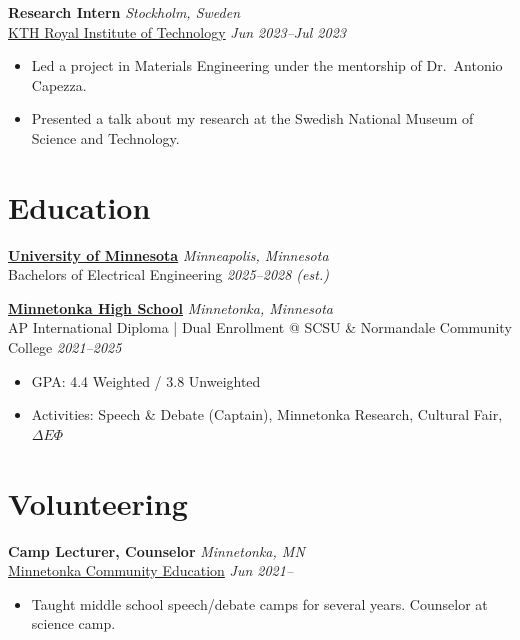 \documentclass[11pt, letterpaper]{article}
\begin{document}
\vspace{0.5em}

\noindent\textbf{{Research Intern}} \hfill \textit{Stockholm, Sweden}\\
\href{https://www.linkedin.com/school/kth/}{KTH Royal Institute of Technology} \hfill \textit{Jun 2023--Jul 2023}
\begin{itemize}
\item Led a project in Materials Engineering under the mentorship of Dr.\ Antonio Capezza.
\item Presented a talk about my research at the Swedish National Museum of Science and Technology.
\end{itemize}

\vspace{-1em}
\section{\Large{Education}}

\noindent\textbf{{\href{https://www.linkedin.com/school/university-of-minnesota/}{University of Minnesota}}} \hfill \textit{Minneapolis, Minnesota}\\
Bachelors of Electrical Engineering \hfill \textit{2025--2028 (est.)}

\vspace{0.5em}

\noindent\textbf{{\href{https://www.linkedin.com/school/minnetonka-senior-high-school/}{Minnetonka High School}}} \hfill \textit{Minnetonka, Minnesota}\\
AP International Diploma | Dual Enrollment @ SCSU \& Normandale Community College \hfill \textit{2021--2025}
\begin{itemize}
\item GPA\@: 4.4 Weighted / 3.8 Unweighted
\item Activities: Speech \& Debate (Captain), Minnetonka Research, Cultural Fair, $\Delta E\Phi$
\end{itemize}

\vspace{-1em}
\section{\Large{Volunteering}}

\noindent\textbf{{Camp Lecturer, Counselor}} \hfill \textit{Minnetonka, MN}\\
\href{https://www.linkedin.com/company/107129508/admin/dashboard/}{Minnetonka Community Education} \hfill \textit{Jun 2021--}
\begin{itemize}
\item Taught middle school speech/debate camps for several years. Counselor at science camp.
\end{itemize}
\end{document}
